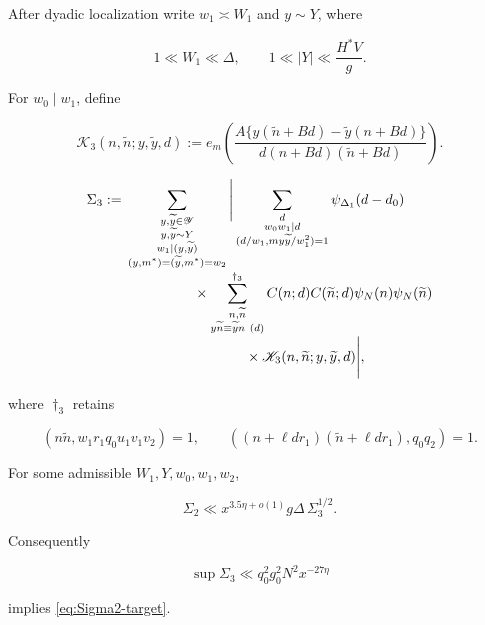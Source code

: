 After dyadic localization write $w_1\asymp W_1$ and $y\sim Y$, where

\begin{equation}\label{eq:WY-ranges}
 1\ll W_1\ll\Delta,\qquad
 1\ll |Y|\ll\frac{H^*V}{g}.
\end{equation}

For $w_0\mid w_1$, define

\begin{equation}\label{eq:K3-def}
 \mathscr K_3(n,\widetilde n;y,\widetilde y,d)
 :=e_m\!\left(
 \frac{A\{y(\widetilde n+Bd)-\widetilde y(n+Bd)\}}
 {d(n+Bd)(\widetilde n+Bd)}
 \right).
\end{equation}

\begin{align}
\Sigma_3:={}&
 \sum_{\substack{y,\widetilde y\in\mathscr Y\\
 y,\widetilde y\sim Y\\w_1\mid(y,\widetilde y)\\
 (y,m^*)=(\widetilde y,m^*)=w_2}}
 \Bigg|
 \sum_{\substack{d\\w_0w_1\mid d\\
 (d/w_1,my\widetilde y/w_1^2)=1}}
 \psi_{\Delta_1}(d-d_0)\notag\\[-1mm]
&\hspace{17mm}\times
 \sum_{\substack{n,\widetilde n\\
 y\widetilde n\equiv\widetilde yn\ (d)}}^{\dagger_3}
 C(n;d)C(\widetilde n;d)\psi_N(n)\psi_N(\widetilde n)\notag\\[-1mm]
&\hspace{30mm}\times
 \mathscr K_3(n,\widetilde n;y,\widetilde y,d)
 \Bigg|,
 \label{eq:Sigma3}
\end{align}

where $\dagger_3$ retains

\begin{equation}\label{eq:dagger3}
 (n\widetilde n,w_1r_1q_0u_1v_1v_2)=1,\qquad
 ((n+\ell dr_1)(\widetilde n+\ell dr_1),q_0q_2)=1.
\end{equation}

\begin{lemma}
\label{lem:qvdc-supported}
For some admissible $W_1,Y,w_0,w_1,w_2$,

\begin{equation}\label{eq:qvdc-bound}
 \Sigma_2\ll x^{3.5\eta+o(1)}g\Delta\,\Sigma_3^{1/2}.
\end{equation}

Consequently

\begin{equation}\label{eq:Sigma3-target}
 \sup\Sigma_3\ll q_0^2g_0^2N^2x^{-27\eta}
\end{equation}

implies \cref{eq:Sigma2-target}.
\end{lemma}

